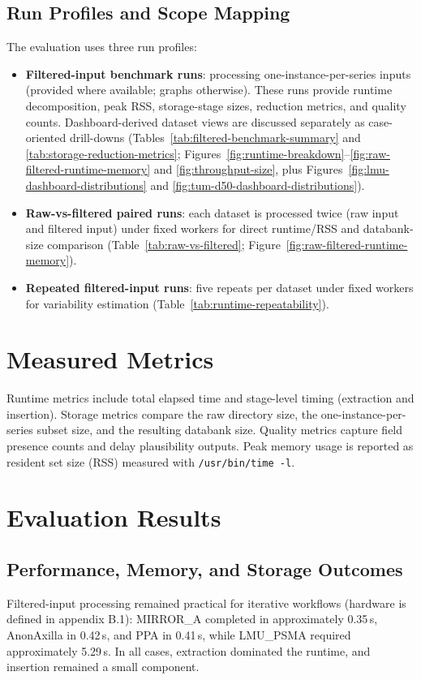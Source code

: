 \subsection*{Run Profiles and Scope Mapping}
The evaluation uses three run profiles:
\begin{itemize}
\item \textbf{Filtered-input benchmark runs}: processing one-instance-per-series inputs (provided where available; graphs otherwise). These runs provide runtime decomposition, peak RSS, storage-stage sizes, reduction metrics, and quality counts. Dashboard-derived dataset views are discussed separately as case-oriented drill-downs (Tables~\ref{tab:filtered-benchmark-summary} and \ref{tab:storage-reduction-metrics}; Figures~\ref{fig:runtime-breakdown}--\ref{fig:raw-filtered-runtime-memory} and \ref{fig:throughput-size}, plus Figures~\ref{fig:lmu-dashboard-distributions} and \ref{fig:tum-d50-dashboard-distributions}).
\item \textbf{Raw-vs-filtered paired runs}: each dataset is processed twice (raw input and filtered input) under fixed workers for direct runtime/RSS and databank-size comparison (Table~\ref{tab:raw-vs-filtered}; Figure~\ref{fig:raw-filtered-runtime-memory}).
\item \textbf{Repeated filtered-input runs}: five repeats per dataset under fixed workers for variability estimation (Table~\ref{tab:runtime-repeatability}).
\end{itemize}

\section{Measured Metrics}
Runtime metrics include total elapsed time and stage-level timing (extraction and insertion). Storage metrics compare the raw directory size, the one-instance-per-series subset size, and the resulting databank size. Quality metrics capture field presence counts and delay plausibility outputs. Peak memory usage is reported as resident set size (RSS) measured with \texttt{/usr/bin/time -l}.

\section{Evaluation Results}
\subsection{Performance, Memory, and Storage Outcomes}
Filtered-input processing remained practical for iterative workflows (hardware is defined in appendix B.1): MIRROR\_A completed in approximately 0.35\,s, AnonAxilla in 0.42\,s, and PPA in 0.41\,s, while LMU\_PSMA required approximately 5.29\,s. In all cases, extraction dominated the runtime, and insertion remained a small component.

